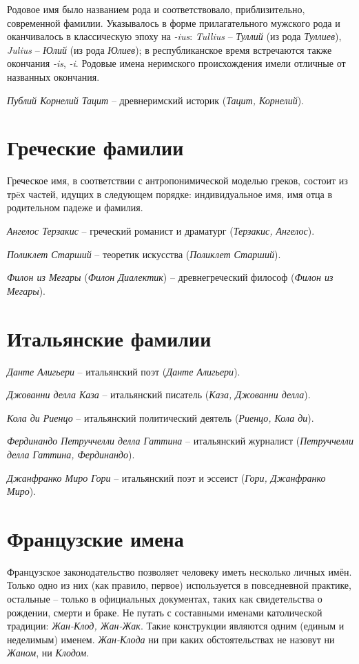 Родовое имя было названием рода и соответствовало, приблизительно, современной фамилии. Указывалось в форме прилагательного мужского рода и оканчивалось в классическую эпоху на \emph{-ius}: \emph{Tullius} -- \emph{Туллий} (из рода \emph{Туллиев}), \emph{Julius} -- \emph{Юлий} (из рода \emph{Юлиев}); в республиканское время встречаются также окончания \emph{-is}, \emph{-i}. Родовые имена неримского происхождения имели отличные от названных окончания.

\emph{Публий Корнелий Тацит} -- древнеримский историк (\emph{Тацит, Корнелий}).

\section{Греческие фамилии}

Греческое имя, в соответствии с антропонимической моделью греков, состоит из тр\"eх частей, идущих в следующем порядке: индивидуальное имя, имя отца в родительном падеже и фамилия.

\emph{Ангелос Терзакис} -- греческий романист и драматург (\emph{Терзакис, Ангелос}).

\emph{Поликлет Старший} -- теоретик искусства (\emph{Поликлет Старший}).

\emph{Филон из Мегары} (\emph{Филон Диалектик}) -- древнегреческий философ (\emph{Филон из Мегары}).

\section{Итальянские фамилии}

\emph{Данте Алигьери} -- итальянский поэт (\emph{Данте Алигьери}).

\emph{Джованни делла Каза} -- итальянский писатель (\emph{Каза, Джованни делла}).

\emph{Кола ди Риенцо} -- итальянский политический деятель (\emph{Риенцо, Кола ди}).

\emph{Фердинандо Петруччелли делла Гаттина} -- итальянский журналист (\emph{Петруччелли делла Гаттина, Фердинандо}).

\emph{Джанфранко Миро Гори} -- итальянский поэт и эссеист (\emph{Гори, Джанфранко Миро}).

\section{Французские имена}

Французское законодательство позволяет человеку иметь несколько личных имён. Только одно из них (как правило, первое) используется в повседневной практике, остальные -- только в официальных документах, таких как свидетельства о рождении, смерти и браке. Не путать с составными именами католической традиции: \emph{Жан-Клод, Жан-Жак}. Такие конструкции являются одним (единым и неделимым) именем. \emph{Жан-Клода} ни при каких обстоятельствах не назовут ни \emph{Жаном}, ни \emph{Клодом}.

